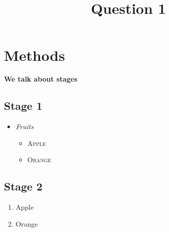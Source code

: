 \documentclass[a4paper,12pt]{article}
\title{Question 1}
\begin{document}
		\maketitle
		\tableofcontents
		\pagebreak
		\section{Methods}
			\LARGE{\textbf{We talk about stages}}
			\subsection{Stage 1}
				\begin{itemize}
					\item \textit{Fruits}
					\begin{itemize}
						\item \textsc{Apple}
						\item \textsc{Orange}
					\end{itemize}
				\end{itemize}
			\subsection{Stage 2}
				\begin{enumerate}
					\item Apple
					\item Orange
				\end{enumerate}
		\pagebreak
	
\end{document}
